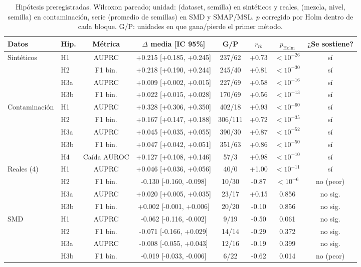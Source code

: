 \begin{table}[t]
\centering\small
\caption{Hipótesis preregistradas. Wilcoxon pareado; unidad: (dataset, semilla) en sintéticos y reales, (mezcla, nivel, semilla) en contaminación, serie (promedio de semillas) en SMD y SMAP/MSL. $p$ corregido por Holm dentro de cada bloque. G/P: unidades en que gana/pierde el primer método.}
\label{tab:hip}
\begin{tabular}{llcccccc}
\toprule
Datos & Hip. & Métrica & $\Delta$ media [IC 95\%] & G/P & $r_{rb}$ & $p_{\text{Holm}}$ & ¿Se sostiene? \\
\midrule
Sintéticos & H1 & AUPRC & +0.215 [+0.185, +0.245] & 237/62 & +0.73 & $<10^{-26}$ & sí \\
 & H2 & F1 bin. & +0.218 [+0.190, +0.244] & 245/40 & +0.81 & $<10^{-30}$ & sí \\
 & H3a & AUPRC & +0.009 [+0.002, +0.015] & 227/69 & +0.58 & $<10^{-16}$ & sí \\
 & H3b & F1 bin. & +0.022 [+0.015, +0.028] & 170/69 & +0.56 & $<10^{-13}$ & sí \\
\midrule
Contaminación & H1 & AUPRC & +0.328 [+0.306, +0.350] & 402/18 & +0.93 & $<10^{-60}$ & sí \\
 & H2 & F1 bin. & +0.167 [+0.147, +0.188] & 306/111 & +0.72 & $<10^{-35}$ & sí \\
 & H3a & AUPRC & +0.045 [+0.035, +0.055] & 390/30 & +0.87 & $<10^{-52}$ & sí \\
 & H3b & F1 bin. & +0.047 [+0.042, +0.051] & 351/63 & +0.86 & $<10^{-50}$ & sí \\
 & H4 & Caída AUROC & +0.127 [+0.108, +0.146] & 57/3 & +0.98 & $<10^{-10}$ & sí \\
\midrule
Reales (4) & H1 & AUPRC & +0.046 [+0.036, +0.056] & 40/0 & +1.00 & $<10^{-11}$ & sí \\
 & H2 & F1 bin. & -0.130 [-0.160, -0.098] & 10/30 & -0.87 & $<10^{-6}$ & no (peor) \\
 & H3a & AUPRC & +0.020 [+0.005, +0.035] & 23/17 & +0.15 & 0.856 & no sig. \\
 & H3b & F1 bin. & +0.002 [-0.001, +0.006] & 20/20 & -0.10 & 0.856 & no sig. \\
\midrule
SMD & H1 & AUPRC & -0.062 [-0.116, -0.002] & 9/19 & -0.50 & 0.061 & no sig. \\
 & H2 & F1 bin. & -0.071 [-0.166, +0.029] & 14/14 & -0.29 & 0.372 & no sig. \\
 & H3a & AUPRC & -0.008 [-0.055, +0.043] & 12/16 & -0.19 & 0.399 & no sig. \\
 & H3b & F1 bin. & -0.019 [-0.033, -0.006] & 6/22 & -0.62 & 0.014 & no (peor) \\

\end{tabular}
\end{table}
